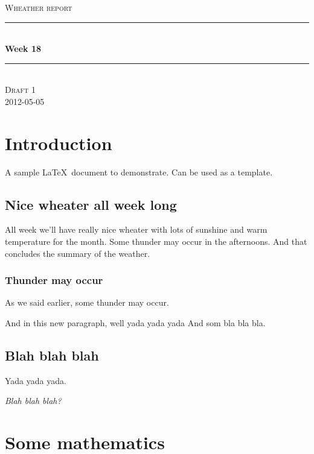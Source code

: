\documentclass[11pt,a4paper]{article}
\newcommand{\HRule}{\rule{\linewidth}{0.5mm}}
\begin{document}
\begin{titlepage}
\begin{center}
\vspace*{3.5 cm}
\textsc{\LARGE Wheather report}\\[1.5cm]


\HRule \\[0.5cm]
{ \huge \bfseries Week 18}\\[0.4cm]
\HRule \\[1.5cm]

\textsc{\Large Draft 1}\\[0.5cm]
\textsc{\Large 2012-05-05}\\[0.5cm]

\end{center}
\end{titlepage}

\tableofcontents
\pagebreak

\section{Introduction}

A sample \LaTeX\ document to demonstrate. Can be used as a template.


\subsection{Nice wheater all week long}

All week we'll have really nice wheater with lots of sunshine and warm temperature for the month.
Some thunder may occur in the afternoons.
And that concludes the summary of the weather.

\subsubsection{Thunder may occur}

As we said earlier, some thunder may occur.

And in this new paragraph, well yada yada yada
And som bla bla bla.

\subsection{Blah blah blah}

Yada yada yada.

\textit{Blah blah blah?}


\section{Some mathematics}
\end{document}
